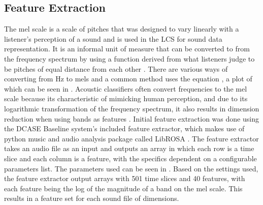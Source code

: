 \documentclass[11pt]{article}
\begin{document}
\begin{multicols}{2}
\subsection{Feature Extraction}
The mel scale is a scale of pitches that was designed to vary linearly with a listener’s perception of a sound and is used in the LCS for sound data representation. It is an informal unit of measure that can be converted to from the frequency spectrum by using a function derived from what listeners judge to be pitches of equal distance from each other \cite{Luening1975}. There are various ways of converting from Hz to mels and a common method uses the equation  \cite{OShaughnessy1987}, a plot of which can be seen in 
. 
Acoustic classifiers often convert frequencies to the mel scale because its characteristic of mimicking human perception, and due to its logarithmic transformation of the frequency spectrum, it also results in dimension reduction when using bands as features \cite{Stowell2014}.
Initial feature extraction was done using the DCASE Baseline system’s included feature extractor, which makes use of python music and audio analysis package called LibROSA \cite{Heittola2017}. The feature extractor takes an audio file as an input and outputs an array in which each row is a time slice and each column is a feature, with the specifics dependent on a configurable parameters list. The parameters used can be seen in 
. 
Based on the settings used, the feature extractor output arrays with 501 time slices and 40 features, with each feature being the log of the magnitude of a band on the mel scale. This results in a feature set for each sound file of  dimensions.


\end{multicols}
\end{document}
